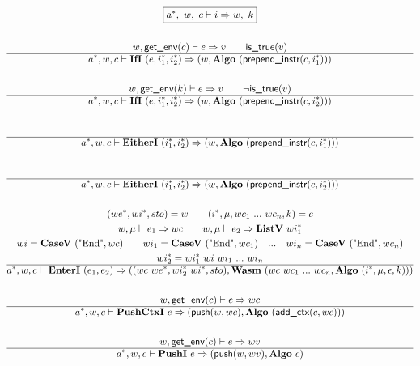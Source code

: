 \begin{gather*}
  \boxed{\seq{a}, ~ w, ~ c \vdash i \Rightarrow w, ~ k} \\
%
\newline \\
  w, \getenv(c) \vdash e \Rightarrow v \qquad
  \istrue(v) \\
  \hline
  \seq{a}, w, c \vdash \ifi ~ (e, \seq{i_1}, \seq{i_2}) \Rightarrow
  (w, \algo ~ (\prependinstr(c, \seq{i_1}))) \\
%
\newline \\
  w, \getenv(k) \vdash e \Rightarrow v \qquad
  \neg \istrue(v) \\
  \hline
  \seq{a}, w, c \vdash \ifi ~ (e, \seq{i_1}, \seq{i_2}) \Rightarrow
  (w, \algo ~ (\prependinstr(c, \seq{i_2}))) \\
%
\newline \\
  \\
  \hline
  \seq{a}, w, c \vdash \eitheri ~ (\seq{i_1}, \seq{i_2}) \Rightarrow
  (w, \algo ~ (\prependinstr(c, \seq{i_1}))) \\
%
\newline \\
  \\
  \hline
  \seq{a}, w, c \vdash \eitheri ~ (\seq{i_1}, \seq{i_2}) \Rightarrow
  (w, \algo ~ (\prependinstr(c, \seq{i_2}))) \\
%
\newline \\
  (\seq{we}, \seq{wi}, sto) = w \qquad
  (i^*, \mu, wc_1 ~ ... ~ wc_n, k) = c \\
  w, \mu \vdash e_1 \Rightarrow wc \qquad
  w, \mu \vdash e_2 \Rightarrow \listv ~ \seq{wi_1} \\
  wi = \casev ~ (\text{"End"}, wc) \qquad
  wi_1 = \casev ~ (\text{"End"}, wc_1) \quad ... \quad wi_n = \casev ~ (\text{"End"}, wc_n) \\
  wi_2^* = wi_1^* ~ wi ~ wi_1 ~ ... ~ wi_n \\
  \hline
  \seq{a}, w, c \vdash \enteri ~ (e_1, e_2)
  \Rightarrow
  (
    (wc ~ \seq{we}, wi_2^* ~ \seq{wi}, sto),
    \wasm ~ (wc ~ wc_1 ~ ... ~ wc_n, \algo ~ (i^*, \mu, \epsilon, k))
  ) \\
%
\newline \\
  w, \getenv(c) \vdash e \Rightarrow wc \\
  \hline
  \seq{a}, w, c \vdash \pushctxi ~ e
  \Rightarrow
  (\push(w, wc), \algo ~ (\addctx(c, wc))) \\
%
\newline \\
  w, \getenv(c) \vdash e \Rightarrow wv \\
  \hline
  \seq{a}, w, c \vdash \pushi ~ e \Rightarrow (\push(w, wv), \algo ~ c) \\
\end{gather*}
